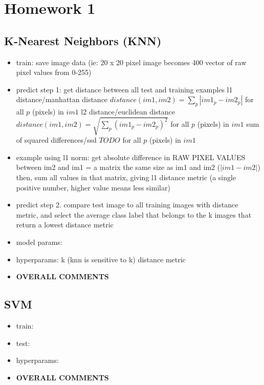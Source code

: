 \documentclass[10pt,letterpaper]{article}
\begin{document}
\section{Homework 1}
\begin{solution}
\subsection{K-Nearest Neighbors (KNN)}
\begin{itemize}
\item train: save image data (ie: 20 x 20 pixel image becomes 400 vector of raw pixel values from 0-255)
\item predict step 1: get distance between all test and training examples
\newline
\newline l1 distance/manhattan distance
\newline $distance(im1, im2) = \sum_p{|im1_p - im2_p|}$ for all $p$ (pixels) in $im1$ 
\newline l2 distance/euclidean distance
\newline $distance(im1, im2) = \sqrt{\sum_p{(im1_p - im2_p)^2}}$ for all $p$ (pixels) in $im1$ 
\newline sum of squared differences/ssd
\newline $TODO$ for all $p$ (pixels) in $im1$ 
\item example using l1 norm: 
\subitem get absolute difference in RAW PIXEL VALUES between im2 and im1
\subitem  = a matrix the same size as im1 and im2 ($|im1-im2|$)  
\subitem then, sum all values in that matrix, giving l1 distance metric 
\subitem (a single positive number, higher value means less similar)
\item predict step 2. compare test image to all training images with distance metric, and select the average class label that belongs to the k images that return a lowest distance metric
\item model params:
\item hyperparams:
\subitem k (knn is sensitive to k)
\subitem distance metric
\item \textbf{OVERALL COMMENTS}
\subitem
\subitem
\subitem
\end{itemize}

\subsection{SVM}
\begin{itemize}
\item train:
\item test:
\item hyperparams:
\subitem
\subitem
\item \textbf{OVERALL COMMENTS}
\subitem
\subitem
\subitem
\end{itemize}


\end{solution}
\end{document}
